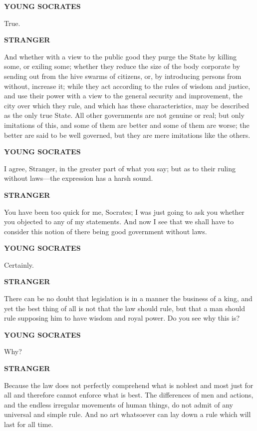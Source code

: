 \documentclass[11pt,letter]{article}
\begin{document}
\par \textbf{YOUNG SOCRATES}
\par   True.

\par \textbf{STRANGER}
\par   And whether with a view to the public good they purge the State by killing some, or exiling some; whether they reduce the size of the body corporate by sending out from the hive swarms of citizens, or, by introducing persons from without, increase it; while they act according to the rules of wisdom and justice, and use their power with a view to the general security and improvement, the city over which they rule, and which has these characteristics, may be described as the only true State. All other governments are not genuine or real; but only imitations of this, and some of them are better and some of them are worse; the better are said to be well governed, but they are mere imitations like the others.

\par \textbf{YOUNG SOCRATES}
\par   I agree, Stranger, in the greater part of what you say; but as to their ruling without laws—the expression has a harsh sound.

\par \textbf{STRANGER}
\par   You have been too quick for me, Socrates; I was just going to ask you whether you objected to any of my statements. And now I see that we shall have to consider this notion of there being good government without laws.

\par \textbf{YOUNG SOCRATES}
\par   Certainly.

\par \textbf{STRANGER}
\par   There can be no doubt that legislation is in a manner the business of a king, and yet the best thing of all is not that the law should rule, but that a man should rule supposing him to have wisdom and royal power. Do you see why this is?

\par \textbf{YOUNG SOCRATES}
\par   Why?

\par \textbf{STRANGER}
\par   Because the law does not perfectly comprehend what is noblest and most just for all and therefore cannot enforce what is best. The differences of men and actions, and the endless irregular movements of human things, do not admit of any universal and simple rule. And no art whatsoever can lay down a rule which will last for all time.
\end{document}
